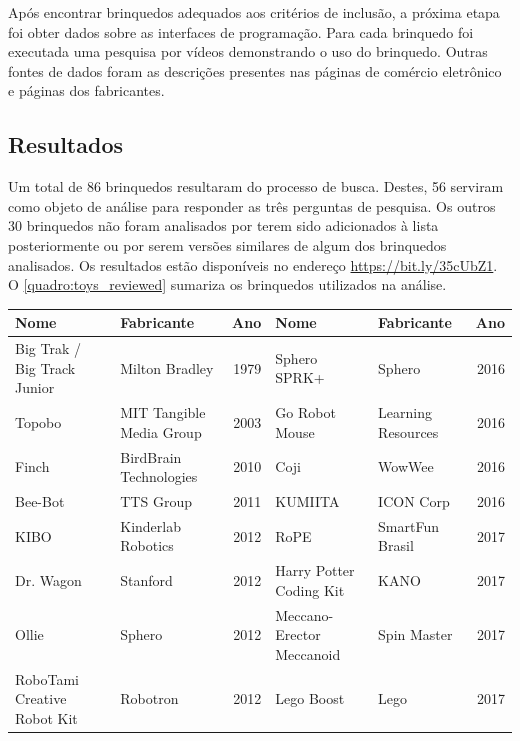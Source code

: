 {Após encontrar brinquedos adequados aos critérios de inclusão, a próxima etapa foi obter dados sobre as interfaces de programação. Para cada brinquedo foi executada uma pesquisa por vídeos demonstrando o uso do brinquedo. Outras fontes de dados foram as descrições presentes nas páginas de comércio eletrônico e páginas dos fabricantes. 

\subsection{Resultados}
Um total de 86 brinquedos resultaram do processo de busca. Destes, 56 serviram como objeto de análise para responder as três perguntas de pesquisa. Os outros 30 brinquedos não foram analisados por terem sido adicionados à lista posteriormente ou por serem versões similares de algum dos brinquedos analisados. Os resultados estão disponíveis no endereço \url{https://bit.ly/35cUbZ1}. O \autoref{quadro:toys_reviewed} sumariza os brinquedos utilizados na análise.
\begin{landscape}
\linespread{1}
\begin{quadro}
 \label{quadro:toys_reviewed}
\end{quadro}
\begin{small}
\begin{longtable}{|p{4.5cm} p{4.5cm} r| p{4.5cm} p{4.5cm} r|}
    \hline
    Nome & Fabricante & Ano & Nome & Fabricante & Ano \\ \hline
    Big Trak / Big Track Junior & Milton Bradley & 1979 &
    Sphero SPRK+ & Sphero & 2016 \\ \hline
    Topobo & MIT Tangible Media Group & 2003 &
    Go Robot Mouse & Learning Resources & 2016 \\ \hline
    Finch & BirdBrain Technologies & 2010 &
    Coji & WowWee & 2016 \\ \hline
    Bee-Bot & TTS Group & 2011 &
    KUMIITA & ICON Corp & 2016 \\ \hline
    KIBO & Kinderlab Robotics & 2012 &
    RoPE & SmartFun Brasil & 2017 \\ \hline
    Dr. Wagon & Stanford & 2012 &
    Harry Potter Coding Kit & KANO & 2017 \\ \hline
    Ollie & Sphero & 2012 &
    Meccano-Erector Meccanoid & Spin Master & 2017 \\ \hline
    RoboTami Creative Robot Kit & Robotron & 2012 &
    Lego Boost & Lego & 2017 \\ \hline

\end{longtable}
\end{small}
\end{landscape}}
